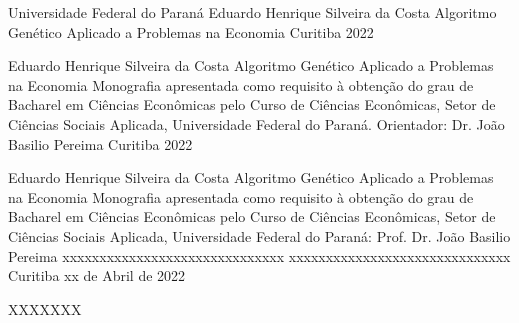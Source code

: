 
\capa
	{Universidade Federal do Paraná}
	{Eduardo Henrique Silveira da Costa}
	{Algoritmo Genético Aplicado a Problemas na Economia}
	{Curitiba}
	{2022}


\folharosto
	{Eduardo Henrique Silveira da Costa}
	{Algoritmo Genético Aplicado a Problemas na Economia}
	{Monografia apresentada como requisito à obtenção do grau de Bacharel em Ciências Econômicas pelo Curso de Ciências Econômicas, Setor de Ciências Sociais Aplicada, Universidade Federal do Paraná.}
	{Orientador: Dr. João Basilio Pereima}
	{Curitiba}
	{2022}


\folhatermoaprovacao
	{Eduardo Henrique Silveira da Costa}
	{Algoritmo Genético Aplicado a Problemas na Economia}
	{Monografia apresentada como requisito à obtenção do grau de Bacharel em Ciências Econômicas pelo Curso de Ciências Econômicas, Setor de Ciências Sociais Aplicada, Universidade Federal do Paraná:}
	{Prof. Dr. João Basilio Pereima}
	{xxxxxxxxxxxxxxxxxxxxxxxxxxxxxx}
	{xxxxxxxxxxxxxxxxxxxxxxxxxxxxxx}
	{Curitiba}
	{xx de Abril de 2022}

\agradecimentos
	{XXXXXXX}


